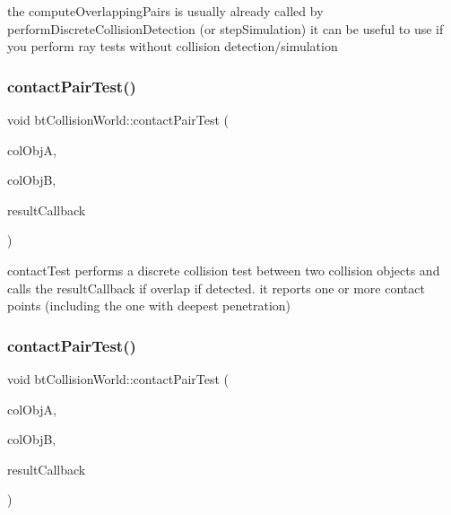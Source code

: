 the compute\+Overlapping\+Pairs is usually already called by perform\+Discrete\+Collision\+Detection (or step\+Simulation) it can be useful to use if you perform ray tests without collision detection/simulation \mbox{\label{classbtCollisionWorld_aabbec542dcd348041db6d07b36a640c8}} 
\subsubsection{\texorpdfstring{contact\+Pair\+Test()}{contactPairTest()}\hspace{0.1cm}{\footnotesize\ttfamily [1/2]}}
{\footnotesize\ttfamily void bt\+Collision\+World\+::contact\+Pair\+Test (\begin{DoxyParamCaption}\item[{bt\+Collision\+Object $\ast$}]{col\+ObjA,  }\item[{bt\+Collision\+Object $\ast$}]{col\+ObjB,  }\item[{\hyperlink{structbtCollisionWorld_1_1ContactResultCallback}{Contact\+Result\+Callback} \&}]{result\+Callback }\end{DoxyParamCaption})}

contact\+Test performs a discrete collision test between two collision objects and calls the result\+Callback if overlap if detected. it reports one or more contact points (including the one with deepest penetration) \mbox{\label{classbtCollisionWorld_aabbec542dcd348041db6d07b36a640c8}} 
\subsubsection{\texorpdfstring{contact\+Pair\+Test()}{contactPairTest()}\hspace{0.1cm}{\footnotesize\ttfamily [2/2]}}
{\footnotesize\ttfamily void bt\+Collision\+World\+::contact\+Pair\+Test (\begin{DoxyParamCaption}\item[{bt\+Collision\+Object $\ast$}]{col\+ObjA,  }\item[{bt\+Collision\+Object $\ast$}]{col\+ObjB,  }\item[{\hyperlink{structbtCollisionWorld_1_1ContactResultCallback}{Contact\+Result\+Callback} \&}]{result\+Callback }\end{DoxyParamCaption})}

